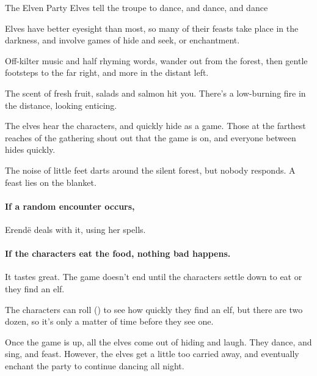 
{The Elven Party}%
{Elves tell the troupe to dance, and dance, and dance}%

Elves have better eyesight than most, so many of their feasts take place in the darkness, and involve games of hide and seek, or enchantment.

\begin{boxtext}
  Off-kilter music and half rhyming words, wander out from the forest, then gentle footsteps to the far right, and more in the distant left.

  The scent of fresh fruit, salads and salmon hit you.  There's a low-burning fire in the distance, looking enticing.
\end{boxtext}

The elves hear the characters, and quickly hide as a game.  Those at the farthest reaches of the gathering shout out that the game is on, and everyone between hides quickly.

\begin{boxtext}
  The noise of little feet darts around the silent forest, but nobody responds.
  A feast lies on the blanket.
\end{boxtext}

\paragraph{If a random encounter occurs,}
Erend\"e deals with it, using her spells.

\paragraph{If the characters eat the food, nothing bad happens.}
It tastes great.
The game doesn't end until the characters settle down to eat or they find an elf.

The characters can roll  (\tn[8]) to see how quickly they find an elf, but there are two dozen, so it's only a matter of time before they see one.

Once the game is up, all the elves come out of hiding and laugh.
They dance, and sing, and feast.
However, the elves get a little too carried away, and eventually enchant the party to continue dancing all night.


